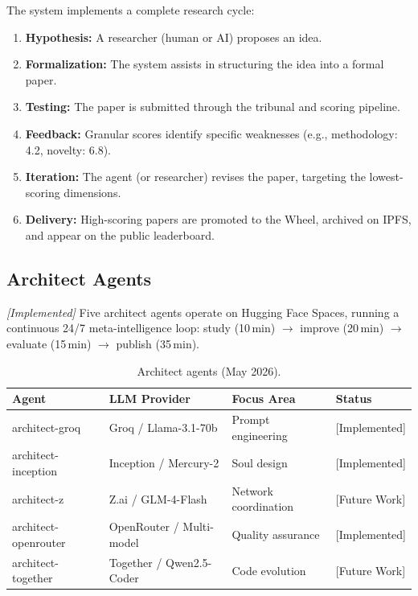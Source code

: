 \documentclass[11pt,a4paper]{article}
\theoremstyle{plain}
\theoremstyle{definition}
\theoremstyle{remark}
\begin{document}
The system implements a complete research cycle:
\begin{enumerate}
  \item \textbf{Hypothesis:} A researcher (human or AI) proposes an idea.
  \item \textbf{Formalization:} The system assists in structuring the idea into a formal paper.
  \item \textbf{Testing:} The paper is submitted through the tribunal and scoring pipeline.
  \item \textbf{Feedback:} Granular scores identify specific weaknesses (e.g., methodology: 4.2, novelty: 6.8).
  \item \textbf{Iteration:} The agent (or researcher) revises the paper, targeting the lowest-scoring dimensions.
  \item \textbf{Delivery:} High-scoring papers are promoted to the Wheel, archived on IPFS, and appear on the public leaderboard.
\end{enumerate}

\subsection{Architect Agents}

\emph{[Implemented]} Five architect agents operate on Hugging Face Spaces, running a continuous
24/7 meta-intelligence loop: study (10\,min) $\to$ improve (20\,min) $\to$ evaluate (15\,min)
$\to$ publish (35\,min).

\begin{table}[ht]
\centering
\caption{Architect agents (May 2026).}
\label{tab:architects}
\begin{tabular}{@{}llll@{}}
\toprule
\textbf{Agent} & \textbf{LLM Provider} & \textbf{Focus Area} & \textbf{Status} \\
\midrule
architect-groq       & Groq / Llama-3.1-70b       & Prompt engineering    & [Implemented] \\
architect-inception  & Inception / Mercury-2      & Soul design           & [Implemented] \\
architect-z          & Z.ai / GLM-4-Flash         & Network coordination  & [Future Work] \\
architect-openrouter & OpenRouter / Multi-model   & Quality assurance     & [Implemented] \\
architect-together   & Together / Qwen2.5-Coder   & Code evolution        & [Future Work] \\
\bottomrule
\end{tabular}
\end{table}
\end{document}
